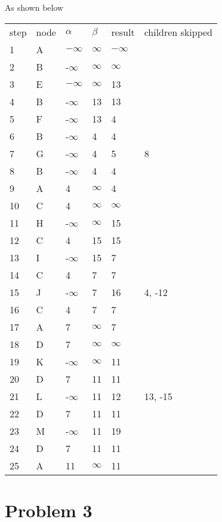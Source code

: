 \documentclass[11pt]{article}
\begin{document}
As shown below \newline
\begin{table}[!h]
\label{my-label}
\begin{tabular}{llllll}
step & node & $\alpha$  & $\beta$  & result & children skipped \\
1    & A    & $-\infty$ & $\infty$  & $-\infty$     &                  \\
2    & B    &  -$\infty$  & $\infty$      &         $\infty$         \\
3    & E    & $-\infty$ & $\infty$  & 13     &                  \\
4    & B    & -$\infty$ & 13 & 13     &                  \\
5    & F    & -$\infty$ & 13 & 4      &                  \\
6    & B    & -$\infty$ & 4  & 4      &                  \\
7    & G    & -$\infty$ & 4  & 5      & 8                \\
8    & B    & -$\infty$ & 4  & 4      &                  \\
9    & A    & 4  & $\infty$  & 4      &                  \\
10   & C    & 4  & $\infty$  & $\infty$      &                  \\
11   & H    & -$\infty$  & $\infty$  & 15     &                  \\
12   & C    & 4  & 15 & 15     &                  \\
13   & I    & -$\infty$  & 15 & 7      &                  \\
14   & C    & 4  & 7  & 7      &                  \\
15   & J    & -$\infty$ & 7  & 16     & 4, -12           \\
16   & C    & 4  & 7  & 7      &                  \\
17   & A    & 7  & $\infty$  & 7      &                  \\
18   & D    & 7  & $\infty$  & $\infty$      &                  \\
19   & K    & -$\infty$  & $\infty$  & 11     &                  \\
20   & D    & 7  & 11 & 11     &                  \\
21   & L    & -$\infty$  & 11 & 12     & 13, -15          \\
22   & D    & 7  & 11 & 11     &                  \\
23   & M    & -$\infty$  & 11 & 19     &                  \\
24   & D    & 7  & 11 & 11     &                  \\
25   & A    & 11 & $\infty$  & 11     &                 
\end{tabular}
\end{table}


\section*{Problem 3}





 
\end{document}
